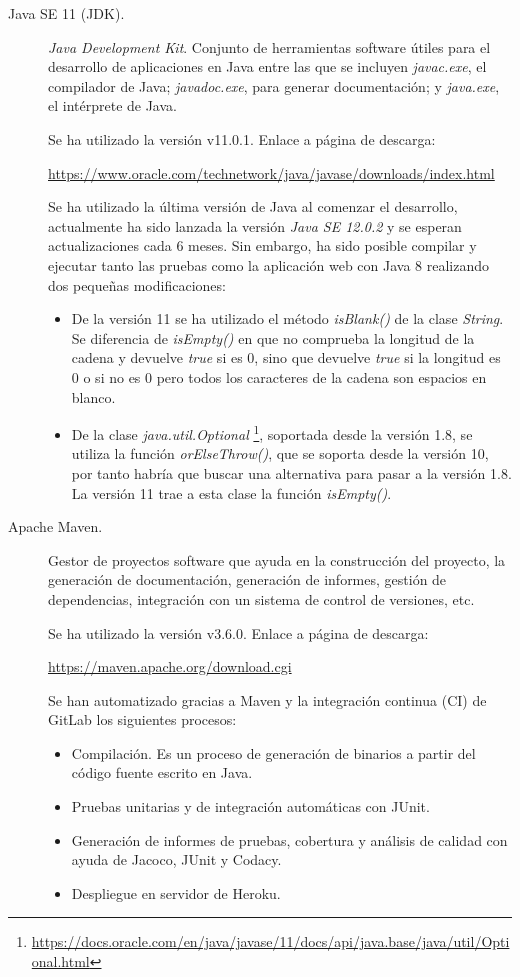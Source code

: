 \begin{description}
	\item[Java SE 11 (JDK).] \textit{Java Development Kit}. Conjunto de herramientas software útiles para el desarrollo de aplicaciones en Java entre las que se incluyen \textit{javac.exe}, el compilador de Java; \textit{javadoc.exe}, para generar documentación; y \textit{java.exe}, el intérprete de Java.
	
		Se ha utilizado la versión  v11.0.1. Enlace a página de descarga:
		
		\url{https://www.oracle.com/technetwork/java/javase/downloads/index.html}
	
		Se ha utilizado la última versión de Java al comenzar el desarrollo, actualmente ha sido lanzada la versión \textit{Java SE 12.0.2} y se esperan actualizaciones cada 6 meses. Sin embargo, ha sido posible compilar y ejecutar tanto las pruebas como la aplicación web con Java 8 realizando dos pequeñas modificaciones:
		\begin{itemize}
			\item De la versión 11 se ha utilizado el método \textit{isBlank()} de la clase \textit{String}. Se diferencia de \textit{isEmpty()} en que no comprueba la longitud de la cadena y devuelve \textit{true} si es 0, sino que devuelve \textit{true} si la longitud es 0 o si no es 0 pero todos los caracteres de la cadena son espacios en blanco.
			\item De la clase \textit{java.util.Optional} \footnote{\url{https://docs.oracle.com/en/java/javase/11/docs/api/java.base/java/util/Optional.html}}, soportada desde la versión 1.8, se utiliza la función \textit{orElseThrow()}, que se soporta desde la versión 10, por tanto habría que buscar una alternativa para pasar a la versión 1.8. La versión 11 trae a esta clase la función \textit{isEmpty()}.
		\end{itemize}
	\item[Apache Maven.] Gestor de proyectos software que ayuda en la construcción del proyecto, la generación de documentación, generación de informes, gestión de dependencias, integración con un sistema de control de versiones, etc. 
	
		Se ha utilizado la versión  v3.6.0. Enlace a página de descarga:
		
		\url{https://maven.apache.org/download.cgi}
		
		Se han automatizado gracias a Maven y la integración continua (CI) de GitLab los siguientes procesos:
		\begin{itemize}
			\item Compilación. Es un proceso de generación de binarios a partir del código fuente escrito en Java.
			\item Pruebas unitarias y de integración automáticas con JUnit.
			\item Generación de informes de pruebas, cobertura y análisis de calidad con ayuda de Jacoco, JUnit y Codacy.
			\item Despliegue en servidor de Heroku.
		\end{itemize}
	

\end{description}
